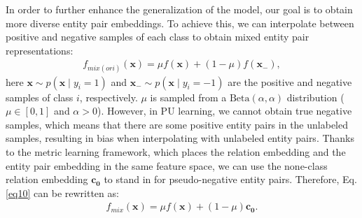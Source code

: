 \documentclass[letterpaper]{article}
\begin{document}
In order to further enhance the generalization of the model, our goal is to obtain more diverse entity pair embeddings. To achieve this, we can interpolate between positive and negative samples of each class to obtain mixed entity pair representations:
\begin{equation}
\begin{aligned}\label{eq10}
f_{mix(ori)}(\boldsymbol{x})=\mu f(\boldsymbol{x})+(1-\mu) f(\boldsymbol{x}_{-}),
\end{aligned}
\end{equation}
here $\boldsymbol{x} \sim p(\boldsymbol{x} \mid y_{i}=1)$ and $\boldsymbol{x}_{-} \sim p(\boldsymbol{x} \mid y_{i}=-1)$ are the positive and negative samples of class $i$, respectively. $\mu$ is sampled from
a $\mathrm{Beta}(\alpha, \alpha)$ distribution ($\mu \in [0, 1]$ and $\alpha > 0$). However, in PU learning, we cannot obtain true negative samples, which means that there are some positive entity pairs in the unlabeled samples, resulting in bias when interpolating with unlabeled entity pairs. Thanks to the metric learning framework, which places the relation embedding and the entity pair embedding in the same feature space, we can use the none-class relation embedding $\boldsymbol{c_{0}}$ to stand in for pseudo-negative entity pairs. Therefore, Eq.\ref{eq10} can be rewritten as:
\begin{equation}
\begin{aligned}\label{eq11}
f_{mix}(\boldsymbol{x})=\mu f(\boldsymbol{x})+(1-\mu) \boldsymbol{c_{0}}.
\end{aligned}
\end{equation}
\end{document}
